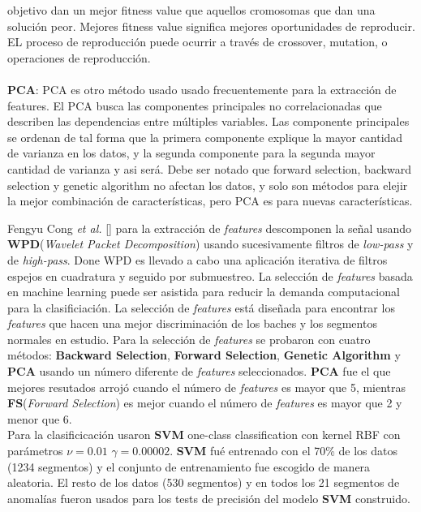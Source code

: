 objetivo dan un mejor fitness value que aquellos cromosomas que dan una solución peor. Mejores fitness value significa mejores oportunidades de reproducir. EL proceso 
de reproducción puede ocurrir a través de crossover, mutation, o operaciones de reproducción. 
\\\\
\textbf{PCA}: PCA es otro método usado usado frecuentemente para la extracción de features. El PCA busca las componentes principales no correlacionadas que describen 
las dependencias entre múltiples variables. Las componente principales se ordenan de tal forma que la primera componente explique la mayor cantidad de varianza en los
datos, y la segunda componente para la segunda mayor cantidad de varianza y asi será.  Debe ser notado que forward selection, backward selection y genetic algorithm 
no afectan los datos, y solo son métodos para elejir la mejor combinación de características, pero PCA es para nuevas características. 


Fengyu Cong {\it et al.} [] para la extracción de \emph{features} descomponen la señal usando \textbf{WPD}(\emph{Wavelet Packet Decomposition}) usando
sucesivamente filtros de \emph{low-pass} y de \emph{high-pass}. Done WPD es llevado a cabo una aplicación iterativa de filtros espejos en cuadratura y seguido por
submuestreo. La selección de \emph{features} basada en machine learning puede ser asistida para reducir la demanda computacional para la clasificiación.
La selección de \emph{features} está diseñada para encontrar los \emph{features} que hacen una mejor discriminación de los baches y los segmentos
normales en estudio. Para la selección de \emph{features} se probaron con cuatro métodos: \textbf{Backward Selection}, \textbf{Forward Selection},
\textbf{Genetic Algorithm} y \textbf{PCA} usando un número diferente de \emph{features} seleccionados. \textbf{PCA} fue el que mejores resutados arrojó
cuando el número de \emph{features} es mayor que 5, mientras \textbf{FS}(\emph{Forward Selection}) es mejor cuando el número de \emph{features} es mayor
que 2 y menor que 6. \\
Para la clasificicación usaron \textbf{SVM} one-class classification con kernel RBF con parámetros  $\nu = 0.01$  $\gamma = 0.00002$. \textbf{SVM} fué
entrenado con el 70\%  de los datos (1234 segmentos) y el conjunto de entrenamiento fue escogido de manera aleatoria. El resto de los datos  (530 segmentos)
y en todos los 21 segmentos de anomalías fueron usados para los tests de precisión del modelo \textbf{SVM} construido. 

